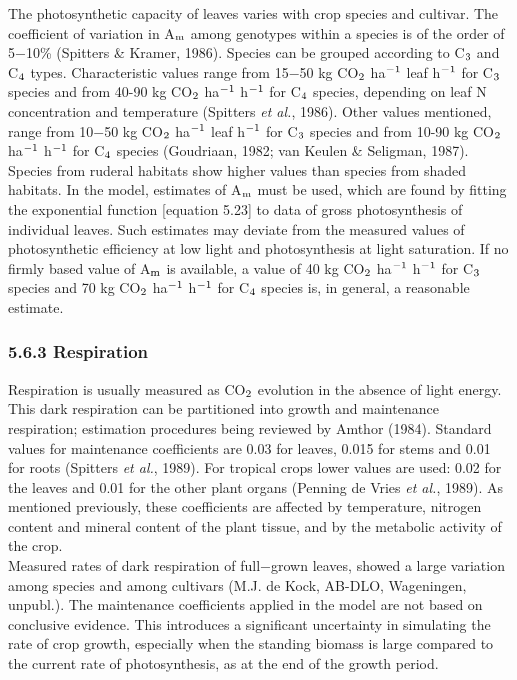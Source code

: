 \documentclass[11pt]{article}
\begin{document}
The photosynthetic capacity of leaves varies with crop species and cultivar. The coeffi\-cient of variation in A$_{{\rm m}}$ among genotypes within a species is of the order of 5$-$10\%
(Spitters \& Kramer, 1986). Species can be grouped according to C$_{{\rm 3}}$ and C$_{{\rm 4}}$ types.
Characteristic values range from 15$-$50 kg CO$_{{\rm 2}}$ ha$^{{\rm -}{1}}$ leaf h$^{{\rm -}{1}}$ for C$_{{\rm 3}}$ species and from 40-90
kg CO$_{{\rm 2}}$ ha$^{{\rm -1}}$ h$^{{\rm -1}}$ for C$_{{\rm 4}}$ species, depending on leaf N concentration and temperature
(Spitters {\it et al.\/}, 1986). Other values mentioned, range from 10$-$50 kg CO$_{{\rm 2}}$ ha$^{{\rm -}{1}}$ leaf h$^{{\rm -}{1}}$ for
C$_{{\rm 3}}$ species and from 10-90 kg CO$_{{\rm 2}}$ ha$^{{\rm -1}}$ h$^{{\rm -1}}$ for C$_{{\rm 4}}$ species (Goudriaan, 1982; van Keulen \&
Seligman, 1987). Species from ruderal habitats show higher values than species from
shaded habitats. In the model, estimates of A$_{{\rm m}}$ must be used, which are found by fitting
the exponential function [equation 5.23] to data of gross photosynthesis of individual
leaves. Such estimates may deviate from the measured values of photosynthetic efficiency
at low light and photosynthesis at light saturation. If no firmly based value of A$_{{\rm m}}$ is
available, a value of 40 kg CO$_{{\rm 2}}$ ha$^{{\rm -1}}$ h$^{{\rm -}{1}}$ for C$_{{\rm 3}}$ species and 70 kg CO$_{{\rm 2}}$ ha$^{{\rm -1}}$ h$^{{\rm -1}}$ for C$_{{\rm 4}}$
species is, in general, a reasonable estimate.

\bigskip
\bigskip
\bigskip
\bigskip
\bigskip
\bigskip
\bigskip

\subsubsection{  5.6.3 Respiration  } 

Respiration is usually measured as CO$_{{\rm 2}}$ evolution in the absence of light energy. This
dark respiration can be partitioned into growth and maintenance respiration; estimation
procedures being reviewed by Amthor (1984). Standard values for maintenance coeffi\-cients are 0.03 for leaves, 0.015 for stems and 0.01 for roots (Spitters {\it et al.\/}, 1989). For
tropical crops lower values are used: 0.02 for the leaves and 0.01 for the other plant
organs (Penning de Vries {\it et al.\/}, 1989). As mentioned previously, these coefficients are
affected by temperature, nitrogen content and mineral content of the plant tissue, and by
the metabolic activity of the crop.   \\
Measured rates of dark respiration of full$-$grown leaves, showed a large variation among
species and among cultivars (M.J. de Kock, AB-DLO, Wageningen, unpubl.). The
maintenance coefficients applied in the model are not based on conclusive evidence. This
introduces a significant uncertainty in simulating the rate of crop growth, especially when
the standing biomass is large compared to the current rate of photosynthesis, as at the end
of the growth period.   
\end{document}
